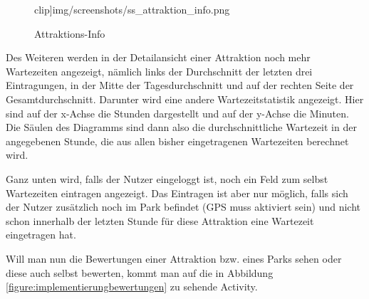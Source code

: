 \begin{figure}[H]
\begin{minipage}{0.49\textwidth}
    	clip]{img/screenshots/ss_attraktion_info.png}
    	\caption{Attraktions-Info}
		\label{figure:implementierungattraktionsinfo}
	\end{minipage}
\end{figure}

Des Weiteren werden in der Detailansicht einer Attraktion noch mehr Wartezeiten angezeigt, nämlich links der Durchschnitt der letzten drei Eintragungen, in der Mitte der Tagesdurchschnitt und auf der rechten Seite der Gesamtdurchschnitt. 
Darunter wird eine andere Wartezeitstatistik angezeigt. Hier sind auf der x-Achse die Stunden dargestellt und auf der y-Achse die Minuten. Die Säulen des Diagramms sind dann also die durchschnittliche Wartezeit in der angegebenen Stunde, die aus allen bisher eingetragenen Wartezeiten berechnet wird. 

Ganz unten wird, falls der Nutzer eingeloggt ist, noch ein Feld zum selbst Wartezeiten eintragen angezeigt. Das Eintragen ist aber nur möglich, falls sich der Nutzer zusätzlich noch im Park befindet (GPS muss aktiviert sein) und nicht schon innerhalb der letzten Stunde für diese Attraktion eine Wartezeit eingetragen hat. 

Will man nun die Bewertungen einer Attraktion bzw. eines Parks sehen oder diese auch selbst bewerten, kommt man auf die in Abbildung \ref{figure:implementierungbewertungen} zu sehende Activity.

